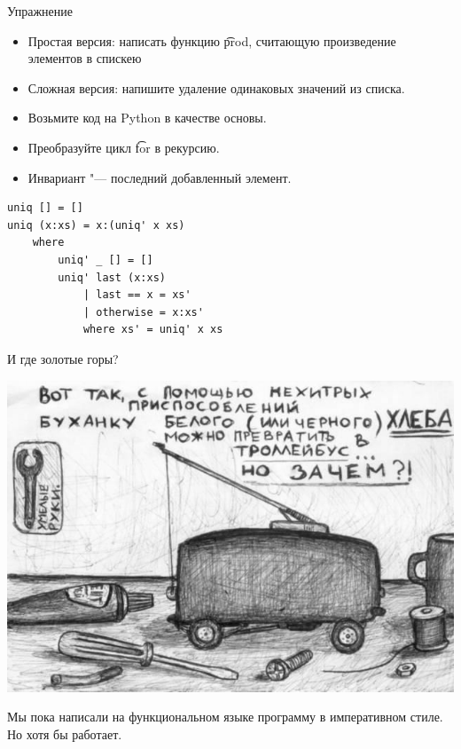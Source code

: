 \begin{frame}[t, fragile]{Упражнение}
	\begin{itemize}
		\item Простая версия: написать функцию \t{prod}, считающую произведение элементов в спискею
		\item Сложная версия: напишите удаление одинаковых значений из списка.
		\item Возьмите код на Python в качестве основы.
		\item Преобразуйте цикл \t{for} в рекурсию. \pause
		\item Инвариант "--- последний добавленный элемент.
	\end{itemize}
	\pause
\begin{verbatim}
uniq [] = []
uniq (x:xs) = x:(uniq' x xs)
    where
        uniq' _ [] = []
        uniq' last (x:xs)
            | last == x = xs'
            | otherwise = x:xs'
            where xs' = uniq' x xs
\end{verbatim}
\end{frame}

\begin{frame}{И где золотые горы?}
	\begin{center}
		\includegraphics[scale=0.35]{bread-why.jpg}
	\end{center}
	Мы пока написали на функциональном языке программу в императивном стиле.
	Но хотя бы работает.
\end{frame}

